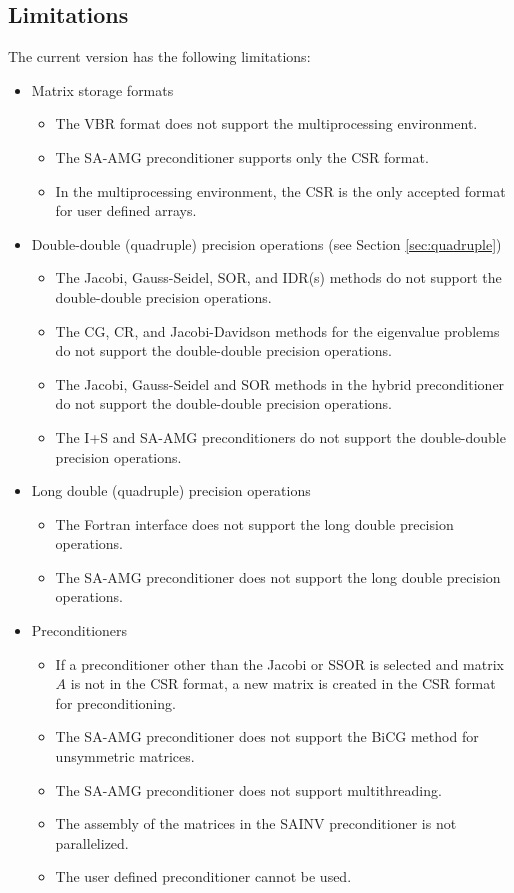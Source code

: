 \documentclass[a4paper]{article}
\begin{document}
\subsection{Limitations}
The current version has the following limitations:
\begin{itemize}

\item Matrix storage formats
\begin{itemize}
\item The VBR format does not support the multiprocessing environment.
\item The SA-AMG preconditioner supports only the CSR format. 
\item In the multiprocessing environment, the CSR is the only accepted
      format for user defined arrays.
\end{itemize}

\item Double-double (quadruple) precision operations (see Section \ref{sec:quadruple})
\begin{itemize}
\item The Jacobi, Gauss-Seidel, SOR, and IDR(s) methods do not support
      the double-double precision operations.
\item The CG, CR, and Jacobi-Davidson methods for the eigenvalue problems do not support the double-double precision operations.
\item The Jacobi, Gauss-Seidel and SOR methods in the hybrid preconditioner do not support the double-double precision operations.
\item The I+S and SA-AMG preconditioners do not support the double-double precision operations.
\end{itemize}

\item Long double (quadruple) precision operations
\begin{itemize}
\item The Fortran interface does not support the long double precision operations.
\item The SA-AMG preconditioner does not support the long double precision operations.
\end{itemize}

\item Preconditioners
\begin{itemize}
\item If a preconditioner other than the Jacobi or SSOR is selected 
      and matrix $A$ is not in the CSR format, a new matrix is created 
      in the CSR format for preconditioning.
\item The SA-AMG preconditioner does not support the BiCG method for unsymmetric matrices. 
\item The SA-AMG preconditioner does not support multithreading. 
\item The assembly of the matrices in the SAINV preconditioner is not parallelized.
\item The user defined preconditioner cannot be used.

\end{itemize}

\end{itemize}
\end{document}
